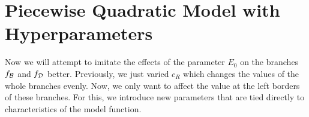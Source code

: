 \section{Piecewise Quadratic Model with Hyperparameters}
\label{sec:setup.quad.hyper}

Now we will attempt to imitate the effects of the parameter $E_0$ on the branches $f_{\mathcal{B}}$ and $f_{\mathcal{D}}$ better.
Previously, we just varied $c_R$ which changes the values of the whole branches evenly.
Now, we only want to affect the value at the left borders of these branches.
For this, we introduce new parameters that are tied directly to characteristics of the model function.




